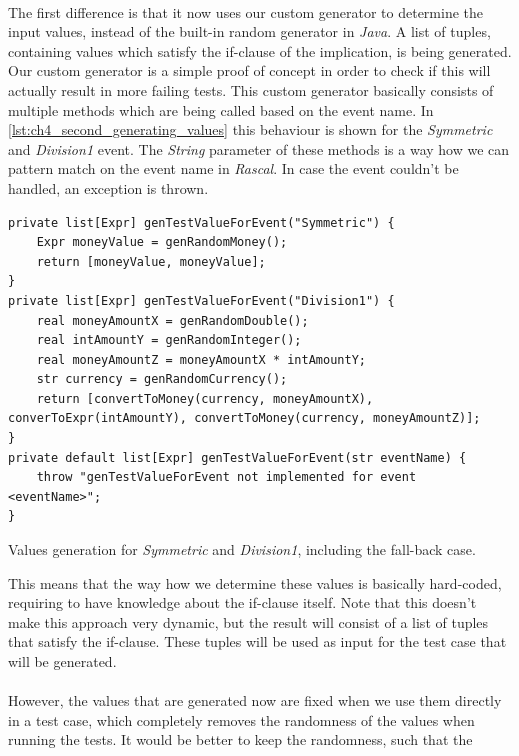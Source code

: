 \\
The first difference is that it now uses our custom generator to determine the
input values, instead of the built-in random generator in \textit{Java}. A list of tuples,
containing values which satisfy the if-clause of the implication, is being
generated. Our custom generator is a simple proof of concept in order to check
if this will actually result in more failing tests. This custom generator
basically consists of multiple methods which are being called based on the event
name. In \autoref{lst:ch4_second_generating_values} this behaviour is shown for
the \textit{Symmetric} and \textit{Division1} event. The \textit{String}
parameter of these methods is a way how we can pattern match on the event name
in \textit{Rascal}. In case the event couldn't be handled, an exception is
thrown.
\begin{sourcecode}[!ht]
\begin{lstlisting}[language=Rascal]
private list[Expr] genTestValueForEvent("Symmetric") {
    Expr moneyValue = genRandomMoney();
    return [moneyValue, moneyValue];
}
private list[Expr] genTestValueForEvent("Division1") {
    real moneyAmountX = genRandomDouble();
    real intAmountY = genRandomInteger();
    real moneyAmountZ = moneyAmountX * intAmountY;
    str currency = genRandomCurrency();
    return [convertToMoney(currency, moneyAmountX), converToExpr(intAmountY), convertToMoney(currency, moneyAmountZ)];
}
private default list[Expr] genTestValueForEvent(str eventName) {
    throw "genTestValueForEvent not implemented for event <eventName>";
}
\end{lstlisting}
\caption{Values generation for \textit{Symmetric} and \textit{Division1}, including the fall-back case.}
\label{lst:ch4_second_generating_values}
\end{sourcecode}
\FloatBarrier\noindent
This means that the way how we determine these values is basically hard-coded,
requiring to have knowledge about the if-clause itself. Note that this doesn't
make this approach very dynamic, but the result will consist of a list of tuples
that satisfy the if-clause. These tuples will be used as input for the test case
that will be generated.\\
\\
However, the values that are generated now are fixed when we use them directly
in a test case, which completely removes the randomness of the values when
running the tests. It would be better to keep the randomness, such that the
